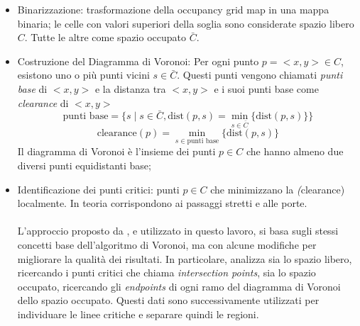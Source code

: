 \begin{itemize}
  \item Binarizzazione: trasformazione della occupancy grid map in una mappa binaria; le celle con valori superiori della soglia sono considerate spazio libero $C$. Tutte le altre come spazio occupato $\bar{C}$.
  \item Costruzione del Diagramma di Voronoi: Per ogni punto $p = <x, y> \in C$, esistono uno o più punti vicini $s \in \bar{C}$. Questi punti vengono chiamati \textit{punti base} di $<x, y>$ e la distanza tra $<x, y>$ e i suoi punti base come \textit{clearance} di $<x, y>$\\
        \begin{equation}
          \text{punti base} = \{s \mid s \in \bar{C}, \text{dist}(p, s) = \min_{s \in \bar{C}} \{\text{dist}(p,s)\}\}
        \end{equation}
        \begin{equation}
          \text{clearance}(p) = \min_{s \in \text{punti base}} \{\text{dist}(p,s)\}
        \end{equation}
        Il diagramma di Voronoi è l'insieme dei punti $p \in C$ che hanno almeno due diversi punti equidistanti base;
  \item Identificazione dei punti critici: punti $p \in C$ che minimizzano la \textit(clearance) localmente. In teoria corrispondono ai passaggi stretti e alle porte.\\\\
        L'approccio proposto da \cite{mora}, e utilizzato in questo lavoro, si basa sugli stessi concetti base dell'algoritmo di Voronoi, ma con alcune modifiche per migliorare la qualità dei risultati. In particolare, analizza sia lo spazio libero, ricercando i punti critici che chiama \textit{intersection points}, sia lo spazio occupato, ricercando gli \textit{endpoints} di ogni ramo del diagramma di Voronoi dello spazio occupato. Questi dati sono successivamente utilizzati per individuare le linee critiche e separare quindi le regioni.
\end{itemize}
